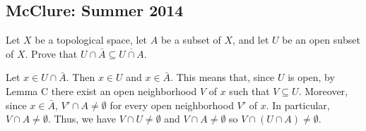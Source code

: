 \subsection{McClure: Summer 2014}
\setcounter{exercise}{0}
\begin{problem}
  Let \(X\) be a topological space, let \(A\) be a subset of \(X\), and let
  \(U\) be an open subset of \(X\). Prove that
  \(U\cap \bar A\subseteq\overline{U\cap A}\).
\end{problem}
\begin{solution}
  Let \(x\in U\cap\bar A\). Then \(x\in U\) and \(x\in\bar A\). This means
  that, since \(U\) is open, by Lemma C there exist an open neighborhood
  \(V\) of \(x\) such that \(V\subseteq U\). Moreover, since
  \(x\in\bar A\), \(V'\cap A\neq\emptyset\) for every open neighborhood
  \(V'\) of \(x\). In particular, \(V\cap A\neq\emptyset\). Thus, we have
  \(V\cap U\neq\emptyset\) and \(V\cap A\neq\emptyset\) so
  \(V\cap(U\cap A)\neq\emptyset\).
\end{solution}

